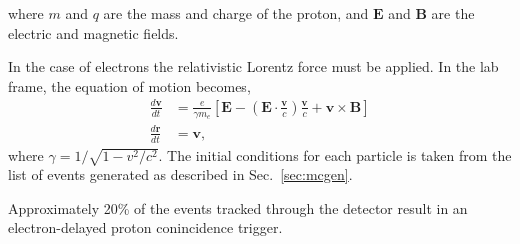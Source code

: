 \documentclass[oneside,12pt]{memoir}
\begin{document}
where $m$ and $q$ are the mass and charge of the proton, and $\mathbf{E}$ and $\mathbf{B}$ are the electric and magnetic fields.\par
In the case of electrons the relativistic Lorentz force must be applied. In the lab frame, the equation of motion becomes,
\begin{subequations}
\begin{align}
	\label{eq:rellorentz}
	\frac{d\mathbf{v}}{dt}&=\frac{e}{\gamma m_e}\left[
		\mathbf{E}-\left(\mathbf{E}\cdot\frac{\mathbf{v}}{c}\right)
		\frac{\mathbf{v}}{c}+\mathbf{v}\times\mathbf{B}\right]\\
	\frac{d\mathbf{r}}{dt}&=\mathbf{v},
\end{align}
\end{subequations}
where $\gamma=1/\sqrt{1-v^2/c^2}$. The initial conditions for each particle is taken from the list of events generated as described in Sec.~\ref{sec:mcgen}.\par
Approximately 20\% of the events tracked through the detector result in an electron-delayed proton conincidence trigger.
\end{document}

